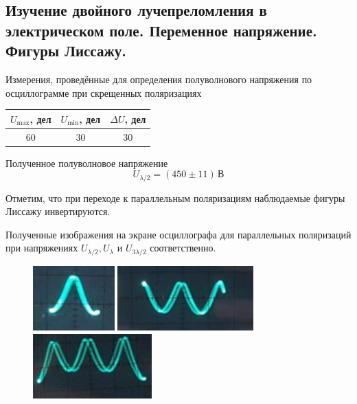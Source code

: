 \documentclass[12pt]{article}
\begin{document}
\subsection*{Изучение двойного лучепреломления в электрическом поле. Переменное напряжение. Фигуры Лиссажу.}
\par
	Измерения, проведённые для определения полуволнового напряжения по осциллограмме при скрещенных поляризациях
\begin{table}[h!]
	\centering
	\begin{tabular}{|c|c|c|}
	\hline
		$U_\text{max}$, дел & $U_\text{min}$, дел & $\Delta U$, дел \\
	\hline
		60  & 30 & 30 \\
	\hline
	\end{tabular}
\end{table}
\par
	Полученное полуволновое напряжение
\[
	U_\text{$\lambda / 2$} = \left(450 \pm 11 \right) \, \text{В}
\]
\par
	Отметим, что при переходе к параллельным поляризациям наблюдаемые фигуры Лиссажу инвертируются.
\newpage
\par
	Полученные изображения на экране осциллографа для параллельных поляризаций при напряжениях $U_\text{$\lambda / 2$}, U_\text{$\lambda$}$ и $U_\text{$3 \lambda / 2$}$ соответственно.
\begin{figure}[h!]
	\centering
	\begin{multicols}{3}
		\hfill
		\includegraphics[height = 2.5cm]{image7.png}
		\hfill
		\includegraphics[height = 2.5cm]{image8.png}
		\hfill
		\includegraphics[height = 2.5cm]{image9.png}
		\hfill
	\end{multicols}
\end{figure}
\end{document}

